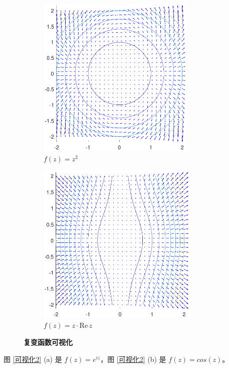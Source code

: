 \documentclass[UTF8]{report}
\def\Re{\mathrm{Re\,}}
\theoremstyle{MyLineTheoremStyle} %
\theoremstyle{MyBlockTheoremStyle} %
\theoremstyle{MySubsubsectionStyle} %
\begin{document}
\begin{figure}[H]\centering
\begin{subfigure}[t]{0.49\textwidth}\centering
    \includegraphics[height=220pt]{assets/z^2.pdf}
    \caption{\bfseries $f(z) = z^2$ }
\end{subfigure}\begin{subfigure}[t]{0.49\textwidth}\centering
    \includegraphics[height=220pt]{assets/zRez.pdf}
    \caption{\bfseries $f(z) = z\cdot \Re z$ }
\end{subfigure}
\caption{\bfseries 复变函数可视化 }\label{可视化1}
\end{figure}

图 \ref{可视化2} (a) 是 $f(z) = e^{iz}$，图 \ref{可视化2} (b) 是 $f(z) = cos(z)$。
\end{document}
